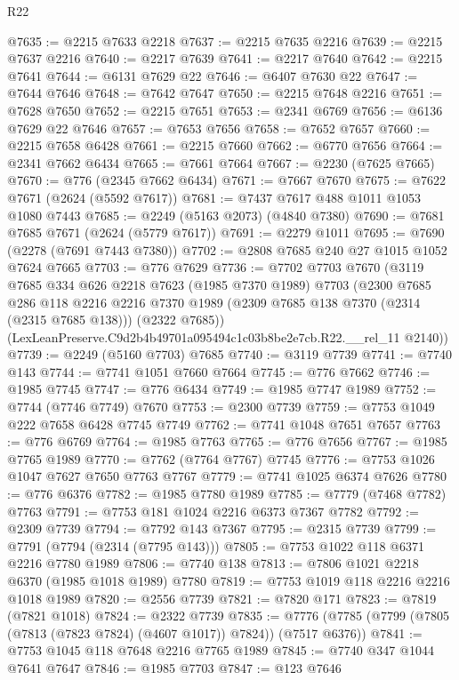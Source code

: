 \begin{lexlean}{R22}
\begin{coremodule}
@7635 := @2215 @7633 @2218
@7637 := @2215 @7635 @2216
@7639 := @2215 @7637 @2216
@7640 := @2217 @7639
@7641 := @2217 @7640
@7642 := @2215 @7641
@7644 := @6131 @7629 @22
@7646 := @6407 @7630 @22
@7647 := @7644 @7646
@7648 := @7642 @7647
@7650 := @2215 @7648 @2216
@7651 := @7628 @7650
@7652 := @2215 @7651
@7653 := @2341 @6769
@7656 := @6136 @7629 @22 @7646
@7657 := @7653 @7656
@7658 := @7652 @7657
@7660 := @2215 @7658 @6428
@7661 := @2215 @7660
@7662 := @6770 @7656
@7664 := @2341 @7662 @6434
@7665 := @7661 @7664
@7667 := @2230 (@7625 @7665)
@7670 := @776 (@2345 @7662 @6434)
@7671 := @7667 @7670
@7675 := @7622 @7671 (@2624 (@5592 @7617))
@7681 := @7437 @7617 @488 @1011 @1053 @1080 @7443
@7685 := @2249 (@5163 @2073) (@4840 @7380)
@7690 := @7681 @7685 @7671 (@2624 (@5779 @7617))
@7691 := @2279 @1011
@7695 := @7690 (@2278 (@7691 @7443 @7380))
@7702 := @2808 @7685 @240 @27 @1015 @1052 @7624 @7665
@7703 := @776 @7629
@7736 := @7702
    @7703
    @7670
    (@3119
      @7685
      @334
      @626
      @2218
      @7623
      (@1985 @7370 @1989)
      @7703
      (@2300
        @7685
        @286
        @118
        @2216
        @2216
        @7370
        @1989
        (@2309 @7685 @138 @7370 (@2314 (@2315 @7685 @138)))
        (@2322 @7685))
      (LexLeanPreserve.C9d2b4b49701a095494c1c03b8be2e7cb.R22.__rel_11 @2140))
@7739 := @2249 (@5160 @7703) @7685
@7740 := @3119 @7739
@7741 := @7740 @143
@7744 := @7741 @1051 @7660 @7664
@7745 := @776 @7662
@7746 := @1985 @7745
@7747 := @776 @6434
@7749 := @1985 @7747 @1989
@7752 := @7744 (@7746 @7749) @7670
@7753 := @2300 @7739
@7759 := @7753 @1049 @222 @7658 @6428 @7745 @7749
@7762 := @7741 @1048 @7651 @7657
@7763 := @776 @6769
@7764 := @1985 @7763
@7765 := @776 @7656
@7767 := @1985 @7765 @1989
@7770 := @7762 (@7764 @7767) @7745
@7776 := @7753 @1026 @1047 @7627 @7650 @7763 @7767
@7779 := @7741 @1025 @6374 @7626
@7780 := @776 @6376
@7782 := @1985 @7780 @1989
@7785 := @7779 (@7468 @7782) @7763
@7791 := @7753 @181 @1024 @2216 @6373 @7367 @7782
@7792 := @2309 @7739
@7794 := @7792 @143 @7367
@7795 := @2315 @7739
@7799 := @7791 (@7794 (@2314 (@7795 @143)))
@7805 := @7753 @1022 @118 @6371 @2216 @7780 @1989
@7806 := @7740 @138
@7813 := @7806 @1021 @2218 @6370 (@1985 @1018 @1989) @7780
@7819 := @7753 @1019 @118 @2216 @2216 @1018 @1989
@7820 := @2556 @7739
@7821 := @7820 @171
@7823 := @7819 (@7821 @1018)
@7824 := @2322 @7739
@7835 := @7776 (@7785 (@7799 (@7805 (@7813 (@7823 @7824) (@4607 @1017)) @7824)) (@7517 @6376))
@7841 := @7753 @1045 @118 @7648 @2216 @7765 @1989
@7845 := @7740 @347 @1044 @7641 @7647
@7846 := @1985 @7703
@7847 := @123 @7646

\end{coremodule}
\end{lexlean}
